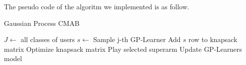 The pseudo code of the algoritm we implemented is as follow.
\begin{algorithm}
	\caption{Gaussian Process CMAB}
	\begin{algorithmic}[1]
		\STATE $J\gets ${ all classes of users}
			\STATE $s \leftarrow$ Sample j-th GP-Learner
			\STATE Add $s$ row to knapsack matrix
			\ENDFOR
			\STATE Optimize knapsack matrix
			\STATE Play selected superarm
			\STATE Update GP-Learners model
		\ENDFOR
	\end{algorithmic}
\end{algorithm}
